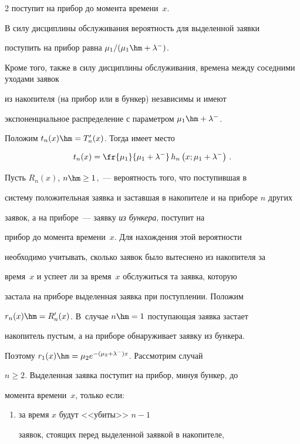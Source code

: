\begin{multicols}{2}
поступит на прибор до момента времени~$x$.


В силу дисциплины обслуживания вероятность для выделенной заявки


поступить на прибор равна ${\mu_1/(\mu_1\hm+\lambda^-)}$.


Кроме того, также в силу дисциплины обслуживания, времена между соседними уходами заявок


из накопителя (на прибор или в бункер) независимы и имеют


экспоненциальное распределение с па\-ра\-мет\-ром $\mu_1\hm+\lambda^-$.


Положим $t_n(x)\hm=T'_n(x)$. Тогда имеет место


$$


t_n(x)= \fr{ \mu_1 }{\mu_1+\lambda^-}\, h_n\left(x;\mu_1+\lambda^-\right)\,.


$$





Пусть $R_n(x)$, $n \hm\ge 1$,~--- вероятность того, что поступившая в


систему положительная заявка и заставшая в накопителе и на приборе $n$ других


заявок, а на приборе~--- заявку \textit{из бункера}, поступит на


прибор до момента времени~$x$. Для нахождения этой вероятности


необходимо учитывать, сколько заявок было вытеснено из накопителя за


время~$x$ и успеет ли за время~$x$ обслужиться та заявка, которую


застала на приборе выделенная заявка при поступлении. Положим


$r_n(x)\hm=R'_n(x)$. В~случае $n\hm=1$ по\-сту\-па\-ющая заявка застает


накопитель пус\-тым, а на приборе обнаруживает заявку из бункера.


Поэтому $r_1(x)\hm= \mu_2 e^{-(\mu_2+\lambda^-) x}$. Рассмотрим случай


$n\ge2$. Выделенная заявка поступит на прибор, минуя бункер, до


момента времени~$x$, только если:


\begin{enumerate}[(1)]


\item за время $x$ будут <<убиты>> $n-1$


заявок, стоящих перед выделенной заявкой в накопителе,



\end{enumerate}
\end{multicols}
